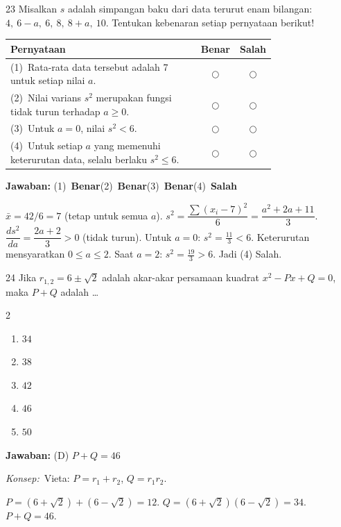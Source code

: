 \documentclass[11pt]{article}
\newcommand{\jawaban}[1]{%
  \noindent\colorbox{gold!30}{\parbox{\dimexpr\linewidth-2\fboxsep\relax}{%
    \textbf{Jawaban:} #1}}\par\smallskip}
\newcommand{\konsep}{\noindent\textit{Konsep:}\ \ignorespaces}
\newenvironment{pilB}{%
  \par\smallskip\begin{multicols}{2}
  \begin{enumerate}[label=(\Alph*),leftmargin=*,itemsep=1pt,topsep=3pt]}%
  {\end{enumerate}\end{multicols}}
\begin{document}
\begin{soal}{23}
Misalkan $s$ adalah simpangan baku dari data terurut enam bilangan:
$4,\ 6-a,\ 6,\ 8,\ 8+a,\ 10$.
Tentukan kebenaran setiap pernyataan berikut!

\par\smallskip
{\renewcommand{\arraystretch}{1.4}%
\begin{tabular}{@{}p{0.76\linewidth}cc@{}}
\hline
\textbf{Pernyataan} & \textbf{Benar} & \textbf{Salah}\\
\hline
(1)~Rata-rata data tersebut adalah 7 untuk setiap nilai $a$.
  & $\bigcirc$ & $\bigcirc$\\
(2)~Nilai varians $s^2$ merupakan fungsi tidak turun terhadap $a\geq0$.
  & $\bigcirc$ & $\bigcirc$\\
(3)~Untuk $a=0$, nilai $s^2<6$.
  & $\bigcirc$ & $\bigcirc$\\
(4)~Untuk setiap $a$ yang memenuhi keterurutan data, selalu berlaku $s^2\leq6$.
  & $\bigcirc$ & $\bigcirc$\\
\hline
\end{tabular}}
\end{soal}
\begin{pembox}
\jawaban{(1)~\textbf{Benar}\quad(2)~\textbf{Benar}\quad(3)~\textbf{Benar}\quad(4)~\textbf{Salah}}
$\bar{x}=42/6=7$ (tetap untuk semua $a$). $s^2=\dfrac{\sum(x_i-7)^2}{6}=\dfrac{a^2+2a+11}{3}$.
$\dfrac{ds^2}{da}=\dfrac{2a+2}{3}>0$ (tidak turun). Untuk $a=0$: $s^2=\tfrac{11}{3}<6$.
Keterurutan mensyaratkan $0\leq a\leq2$. Saat $a=2$: $s^2=\tfrac{19}{3}>6$. Jadi (4) Salah.
\end{pembox}

\begin{soal}{24}
Jika $r_{1,2}=6\pm\sqrt{2}$ adalah akar-akar persamaan kuadrat
$x^2-Px+Q=0$, maka $P+Q$ adalah \ldots
\begin{pilB}
  \item $34$ \item $38$ \item $42$ \item $46$ \item $50$
\end{pilB}
\end{soal}
\begin{pembox}
\jawaban{(D) $P+Q=46$}
\konsep Vieta: $P=r_1+r_2$, $Q=r_1 r_2$.

$P=(6+\sqrt{2})+(6-\sqrt{2})=12$.\; $Q=(6+\sqrt{2})(6-\sqrt{2})=34$.
$P+Q=46$.
\end{pembox}
\end{document}
